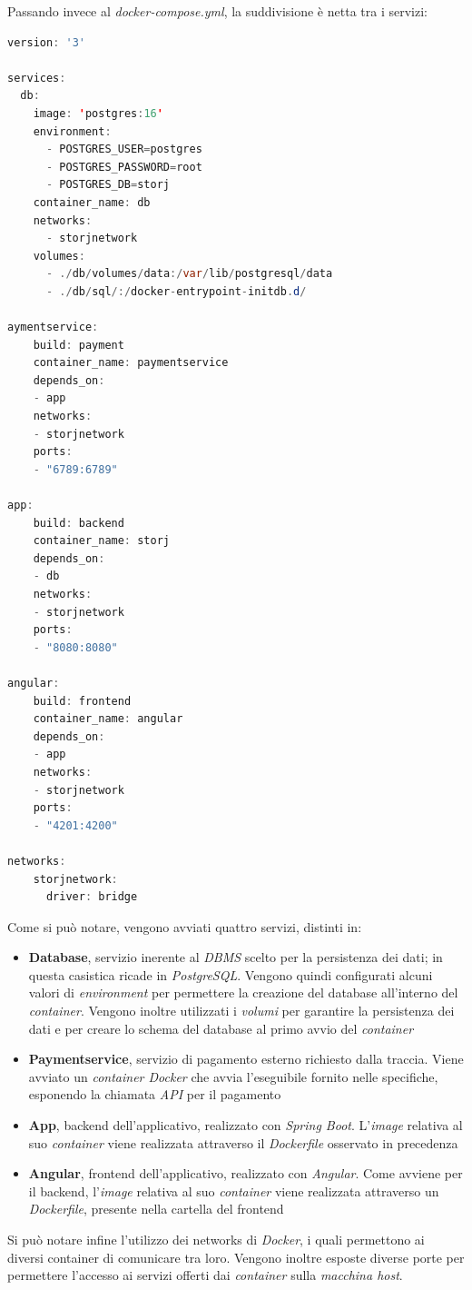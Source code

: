 \documentclass{article}
\begin{document}
Passando invece al \textit{docker-compose.yml}, la suddivisione è netta tra i servizi:\vspace*{7pt}
\begin{lstlisting}[language = JAVA]
version: '3'

services:
  db:
    image: 'postgres:16'
    environment:
      - POSTGRES_USER=postgres
      - POSTGRES_PASSWORD=root
      - POSTGRES_DB=storj
    container_name: db
    networks:
      - storjnetwork
    volumes:
      - ./db/volumes/data:/var/lib/postgresql/data
      - ./db/sql/:/docker-entrypoint-initdb.d/

aymentservice:
    build: payment
    container_name: paymentservice
    depends_on:
    - app
    networks:
    - storjnetwork
    ports:
    - "6789:6789"

app:
    build: backend
    container_name: storj
    depends_on:
    - db
    networks:
    - storjnetwork
    ports:
    - "8080:8080"

angular:
    build: frontend
    container_name: angular
    depends_on:
    - app
    networks:
    - storjnetwork
    ports:
    - "4201:4200"

networks:
    storjnetwork:
      driver: bridge
\end{lstlisting}
Come si può notare, vengono avviati quattro servizi, distinti in:
\begin{itemize}[label = {-}]
    \itemsep0em
    \item \textbf{Database}, servizio inerente al \textit{DBMS} scelto per la persistenza dei dati; in questa casistica ricade in \textit{PostgreSQL}. Vengono quindi configurati alcuni valori di \textit{environment} per permettere la creazione del database all'interno del \textit{container}. Vengono inoltre utilizzati i \textit{volumi} per garantire la persistenza dei dati e per creare lo schema del database al primo avvio del \textit{container}
    \item \textbf{Paymentservice}, servizio di pagamento esterno richiesto dalla traccia. Viene avviato un \textit{container Docker} che avvia l'eseguibile fornito nelle specifiche, esponendo la chiamata \textit{API} per il pagamento
    \item \textbf{App}, backend dell'applicativo, realizzato con \textit{Spring Boot}. L'\textit{image} relativa al suo \textit{container} viene realizzata attraverso il \textit{Dockerfile} osservato in precedenza
    \item \textbf{Angular}, frontend dell'applicativo, realizzato con \textit{Angular}. Come avviene per il backend, l'\textit{image} relativa al suo \textit{container} viene realizzata attraverso un \textit{Dockerfile}, presente nella cartella del frontend
\end{itemize}
Si può notare infine l'utilizzo dei networks di \textit{Docker}, i quali permettono ai diversi container di comunicare tra loro. Vengono inoltre esposte diverse porte per permettere l'accesso ai servizi offerti dai \textit{container} sulla \textit{macchina host}.
\end{document}
